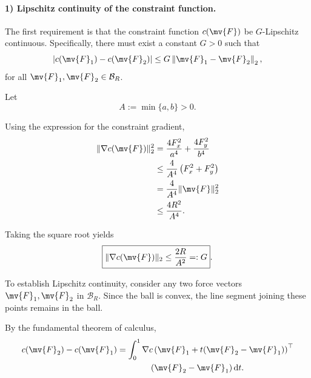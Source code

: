 \paragraph{1) Lipschitz continuity of the constraint function.}

The first requirement is that the constraint function $c(\mv{F})$ be
$G$-Lipschitz continuous. Specifically, there must exist a constant $G>0$ such
that
\begin{equation}
	\left|
	c(\mv{F}_1)
	-
	c(\mv{F}_2)
	\right|
	\leq
	G
	\left\|
	\mv{F}_1-\mv{F}_2
	\right\|_2
	,
\end{equation}
for all $\mv{F}_1,\mv{F}_2\in\mathcal{B}_R$.

Let
\begin{equation}
	A
	:=
	\min\{a,b\}
	>0
	.
\end{equation}

Using the expression for the constraint gradient,
\begin{equation}
	\begin{aligned}
		\|\nabla c(\mv{F})\|_2^2
		 & =
		\frac{4F_x^2}{a^4}
		+
		\frac{4F_y^2}{b^4}
		\\
		 & \leq
		\frac{4}{A^4}
		\left(
		F_x^2+F_y^2
		\right)
		\\
		 & =
		\frac{4}{A^4}
		\|\mv{F}\|_2^2
		\\
		 & \leq
		\frac{4R^2}{A^4}
		.
	\end{aligned}
\end{equation}

Taking the square root yields
\begin{equation}
	\label{Tire:eq:constraint:lipschitz}
	\boxed{
		\|\nabla c(\mv{F})\|_2
		\leq
		\frac{2R}{A^2}
		=:
		G
	}
	.
\end{equation}

To establish Lipschitz continuity, consider any two force vectors
$\mv{F}_1,\mv{F}_2$ in $\mathcal{B}_R$. Since the ball is convex, the line
segment joining these points remains in the ball.

By the fundamental theorem of calculus,
\begin{equation}
	\begin{aligned}
		c(\mv{F}_2)-c(\mv{F}_1)
		 & =
		\int_0^1
		\nabla c
		\left(
		\mv{F}_1
		+
		t(\mv{F}_2-\mv{F}_1)
		\right)^\top
		\\
		 & \qquad\qquad
		(\mv{F}_2-\mv{F}_1)
		\,\mathrm{d}t
		.
	\end{aligned}
\end{equation}

